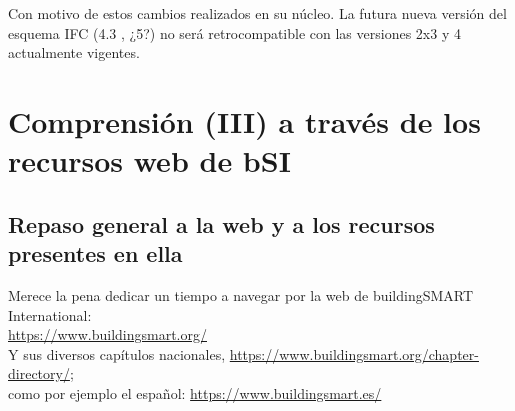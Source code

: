 \documentclass[spanish,10pt,a4paper,final,oneside]{article}
\begin{document}
Con motivo de estos cambios realizados en su núcleo. La futura nueva versión del esquema IFC (4.3 , ¿5?) no será retrocompatible con las versiones 2x3 y 4 actualmente vigentes. 


\newpage
\section{Comprensión (III) a través de los recursos web de bSI}

\subsection{Repaso general a la web y a los recursos presentes en ella}

Merece la pena dedicar un tiempo a navegar por la web de buildingSMART International:
\\ \url{https://www.buildingsmart.org/}
\\Y sus diversos capítulos nacionales, \url{https://www.buildingsmart.org/chapter-directory/}; 
\\como por ejemplo el español: \url{https://www.buildingsmart.es/}
\end{document}
